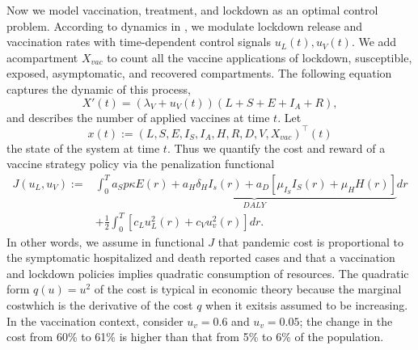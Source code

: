 Now we model vaccination, treatment, and lockdown as an optimal control problem.
According to dynamics in , we modulate lockdown
release and vaccination rates with time-dependent control signals
$u_L(t), u_V(t)$. We add acompartment $X_{vac}$ to count all the vaccine 
applications of lockdown, susceptible, exposed, asymptomatic, and recovered 
compartments. The following equation captures the dynamic of this process,
\begin{equation}
\label{eqn:counter}
  X'(t) =
    (\lambda_V + u_V(t))(L + S + E + I_A + R),
\end{equation}
and describes the number of applied vaccines at time $t$.
Let
$$
    x(t):= 
        (L, S, E, I_S, I_A, H, R, D, V, X_{vac}) ^ {\top}(t)
$$
the state of the system at time $t$. 
Thus we quantify the cost and reward of a vaccine
strategy policy via the penalization functional
\begin{equation}
    \label{eqn:cost_functional}
    \begin{aligned}
    J(u_L, u_V) := &
        \int _0 ^ T
            \underbrace{
                a_S p \kappa E(r) +
                a_H \delta_H I_s(r) +
                a_D
                \left[
                    \mu_{I_S} I_S(r) + \mu_H H(r)
                \right] 
            }_{DALY}
        dr
        \\
        & +
    \frac{1}{2}
        \int _0 ^ T
            \left[
                c_L u_L^2(r) +
                c_V u_v^2(r)
            \right]
        dr.
    \end{aligned}
\end{equation}
%
    In other words, we assume in functional $J$ that pandemic cost is 
proportional to the symptomatic hospitalized and death reported cases and that 
a vaccination and lockdown policies implies quadratic consumption of resources.
The quadratic form $q(u)=u^2$ of the cost is typical in economic
theory because the marginal cost\textemdash which is the derivative of the cost
$q$ when it exits\textemdash is assumed to be increasing. In the
vaccination context, consider $u_v=0.6$ and $u_v=0.05$; the change
in the cost from 60\% to 61\% is higher than that from 5\% to 6\%
of the population.

